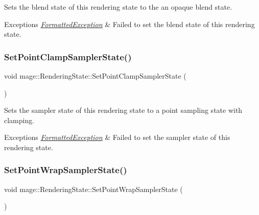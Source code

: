 Sets the blend state of this rendering state to the an opaque blend state.


\begin{DoxyExceptions}{Exceptions}
{\em \hyperlink{structmage_1_1_formatted_exception}{Formatted\+Exception}} & Failed to set the blend state of this rendering state. \\
\hline
\end{DoxyExceptions}
\hypertarget{structmage_1_1_rendering_state_aabf9e70b12cb12560e6c6c880bbc08ca}{}\label{structmage_1_1_rendering_state_aabf9e70b12cb12560e6c6c880bbc08ca} 
\subsubsection{\texorpdfstring{Set\+Point\+Clamp\+Sampler\+State()}{SetPointClampSamplerState()}}
{\footnotesize\ttfamily void mage\+::\+Rendering\+State\+::\+Set\+Point\+Clamp\+Sampler\+State (\begin{DoxyParamCaption}{ }\end{DoxyParamCaption})}

Sets the sampler state of this rendering state to a point sampling state with clamping.


\begin{DoxyExceptions}{Exceptions}
{\em \hyperlink{structmage_1_1_formatted_exception}{Formatted\+Exception}} & Failed to set the sampler state of this rendering state. \\
\hline
\end{DoxyExceptions}
\hypertarget{structmage_1_1_rendering_state_ab8cebd05d1b01ec22f311aa0f1c1dc7e}{}\label{structmage_1_1_rendering_state_ab8cebd05d1b01ec22f311aa0f1c1dc7e} 
\subsubsection{\texorpdfstring{Set\+Point\+Wrap\+Sampler\+State()}{SetPointWrapSamplerState()}}
{\footnotesize\ttfamily void mage\+::\+Rendering\+State\+::\+Set\+Point\+Wrap\+Sampler\+State (\begin{DoxyParamCaption}{ }\end{DoxyParamCaption})}

